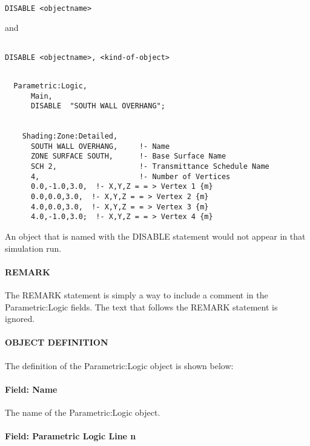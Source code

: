 \begin{lstlisting}

DISABLE <objectname>
\end{lstlisting}

and

\begin{lstlisting}

DISABLE <objectname>, <kind-of-object>
\end{lstlisting}

\begin{lstlisting}

  Parametric:Logic,
      Main,
      DISABLE  "SOUTH WALL OVERHANG";


    Shading:Zone:Detailed,
      SOUTH WALL OVERHANG,     !- Name
      ZONE SURFACE SOUTH,      !- Base Surface Name
      SCH 2,                   !- Transmittance Schedule Name
      4,                       !- Number of Vertices
      0.0,-1.0,3.0,  !- X,Y,Z = = > Vertex 1 {m}
      0.0,0.0,3.0,  !- X,Y,Z = = > Vertex 2 {m}
      4.0,0.0,3.0,  !- X,Y,Z = = > Vertex 3 {m}
      4.0,-1.0,3.0;  !- X,Y,Z = = > Vertex 4 {m}
\end{lstlisting}

An object that is named with the DISABLE statement would not appear in that simulation run.

\paragraph{REMARK}\label{remark}

The REMARK statement is simply a way to include a comment in the Parametric:Logic fields. The text that follows the REMARK statement is ignored.

\paragraph{OBJECT DEFINITION}\label{object-definition}

The definition of the Parametric:Logic object is shown below:

\paragraph{Field: Name}\label{field-name-029}

The name of the Parametric:Logic object.

\paragraph{Field: Parametric Logic Line n}\label{field-parametric-logic-line-n}

